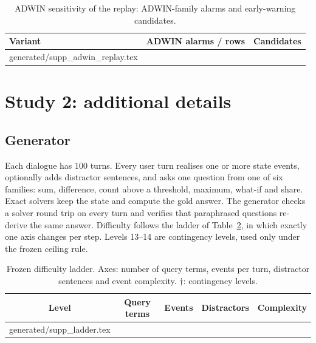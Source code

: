 \documentclass[10pt]{article}
\makeatletter
\newcommand{\inputtable}[1]{\@@input #1 }
\makeatother
\begin{document}
\begin{table}[h]\centering\small
\caption{ADWIN sensitivity of the replay: ADWIN-family alarms and
early-warning candidates.}
\label{tab:adwreplay}
\begin{tabular}{lcc}\toprule
Variant & ADWIN alarms / rows & Candidates\\\midrule
\inputtable{generated/supp_adwin_replay.tex}
\bottomrule\end{tabular}\end{table}

\section{Study 2: additional details}

\subsection{Generator}
Each dialogue has 100 turns. Every user turn realises one or more state events,
optionally adds distractor sentences, and asks one question from one of six
families: sum, difference, count above a threshold, maximum, what-if and share.
Exact solvers keep the state and compute the gold answer. The generator checks
a solver round trip on every turn and verifies that paraphrased questions
re-derive the same answer. Difficulty follows the ladder of
Table~\ref{tab:ladder}, in which exactly one axis changes per step. Levels
13--14 are contingency levels, used only under the frozen ceiling rule.

\begin{table}[h]\centering\small
\caption{Frozen difficulty ladder. Axes: number of query terms, events per
turn, distractor sentences and event complexity. $\dagger$: contingency
levels.}
\label{tab:ladder}
\begin{tabular}{ccccc}\toprule
Level & Query terms & Events & Distractors & Complexity\\\midrule
\inputtable{generated/supp_ladder.tex}
\bottomrule\end{tabular}\end{table}
\end{document}
